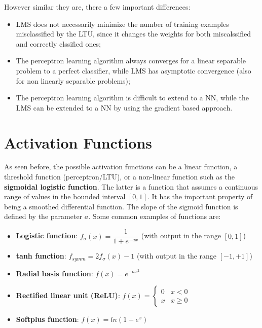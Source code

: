 However similar they are, there a few important differences:

\begin{itemize}
    \item LMS does not necessarily minimize the number of training examples misclassified by the LTU, since it changes the weights for both miscalssified and correctly clssified ones;

    \item The perceptron learning algorithm always converges for a linear separable problem to a perfect classifier, while LMS has asymptotic convergence (also for non linearly separable problems);

    \item The perceptron learning algorithm is difficult to extend to a NN, while the LMS can be extended to a NN by using the gradient based approach.
\end{itemize}

\section{Activation Functions}

As seen before, the possible activation functions can be a linear function, a threshold function (perceptron/LTU), or a non-linear function such as the \textbf{sigmoidal logistic function}. The latter is a function that assumes a continuous range of values in the bounded interval $[0,1]$. It has the important property of being a smoothed differential function. The slope of the sigmoid function is defined by the parameter $a$. Some common examples of functions are:

\begin{itemize}
    \item \textbf{Logistic function}: $f_{\sigma}(x) = \dfrac{1}{1+e^{-ax}}$ (with output in the range $[0,1]$)

    \item \textbf{tanh function}: $f_{symm} = 2f_{\sigma}(x) - 1$ (with output in the range $[-1,+1]$)

    \item \textbf{Radial basis function}: $f(x) = e^{-ax^2}$

    \item \textbf{Rectified linear unit (ReLU)}:
    $f(x) = \begin{cases}
            0 & x < 0 \\
            x & x \geq 0
            \end{cases}$

    \item \textbf{Softplus function}: $f(x) = ln(1+e^x)$
\end{itemize}

